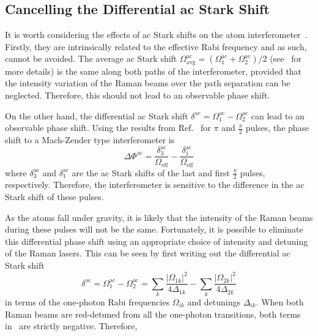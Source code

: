 \subsection{Cancelling the Differential ac Stark
Shift}\label{subsec:light_shift}
It is worth considering the effects of ac Stark shifts on the atom
interferometer~\cite{Gauguet2008}. Firstly, they are intrinsically related to the
effective Rabi frequency and as such, cannot be avoided. The average
ac Stark shift \(\Omega^\text{ac}_\text{avg} = (\Omega_1^\text{ac} +
\Omega_2^\text{ac})/2 \) (see~ for more
details) is
the same along both paths of the interferometer, provided that the
intensity variation of the Raman beams over the path separation can be
neglected. Therefore, this should not lead to an observable phase
shift.
\par\noindent
On the other hand, the differential ac Stark shift \(\delta^\text{ac}
= \Omega_1^\text{ac} - \Omega_2^\text{ac}\) can lead to an observable
phase shift. Using the results from Ref.~\cite{Weiss1994} for \(\pi\)
and \(\frac{\pi}{2}\) pulses, the phase shift to a Mach-Zender type
interferometer is
\begin{equation}
  \Delta \Phi^\text{ac} =
  \frac{\delta_3^\text{ac}}{\Omega_\text{eff}} - \frac{\delta_1^\text{ac}}{\Omega_\text{eff}} 
 \label{eq:diff_phase}
\end{equation}
where \(\delta_3^\text{ac}\) and \(\delta_1^\text{ac}\) are the ac
Stark shifts of the last and first \(\frac{\pi}{2}\) pulses,
respectively. Therefore, the interferometer is sensitive to the
difference in the ac Stark shift of these pulses. 
\par\noindent
As the atoms fall
under gravity, it is likely that the intensity of the Raman beams
during these pulses will not be the same. Fortunately, it is possible
to eliminate this differential phase shift using an appropriate choice
of intensity and detuning of the Raman lasers. This can be seen by
first writing out the differential ac Stark shift
\begin{equation}
  \delta^\text{ac} = \Omega_1^\text{ac} - \Omega_2^\text{ac} = \sum_{k}
  \frac{\lvert\Omega_{1k}\rvert^2}{4\Delta_{1k}} - \sum_{k}
  \frac{\lvert\Omega_{2k}\rvert^2}{4\Delta_{2k}} 
  \label{eq:diff_shift}
\end{equation}
in terms of the one-photon Rabi frequencies \(\Omega_{ik}\) and
detunings \(\Delta_{ik}\). When both Raman beams are red-detuned from
all the one-photon transitions, both terms
in~ are strictly negative. Therefore,
